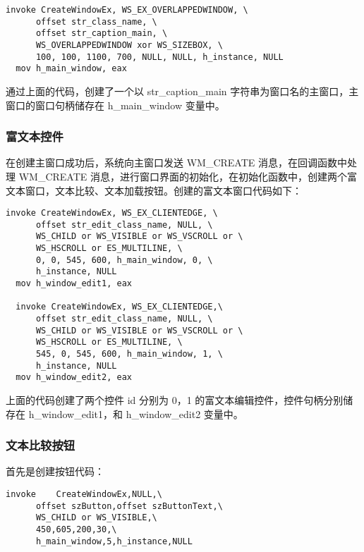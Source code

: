 \documentclass[proposal-report]{bitart}
\begin{document}
\begin{lstlisting}[language={[x86masm]Assembler}]
  invoke CreateWindowEx, WS_EX_OVERLAPPEDWINDOW, \
      offset str_class_name, \
      offset str_caption_main, \
      WS_OVERLAPPEDWINDOW xor WS_SIZEBOX, \
      100, 100, 1100, 700, NULL, NULL, h_instance, NULL
  mov h_main_window, eax
\end{lstlisting}

通过上面的代码，创建了一个以 str\_caption\_main 字符串为窗口名的主窗口，主窗口的窗口句柄储存在 h\_main\_window 变量中。

\subsubsection{富文本控件}

在创建主窗口成功后，系统向主窗口发送 WM\_CREATE 消息，在回调函数中处理 WM\_CREATE 消息，进行窗口界面的初始化，在初始化函数中，创建两个富文本窗口，文本比较、文本加载按钮。创建的富文本窗口代码如下：

\begin{lstlisting}[language={[x86masm]Assembler}]
  invoke CreateWindowEx, WS_EX_CLIENTEDGE, \
      offset str_edit_class_name, NULL, \
      WS_CHILD or WS_VISIBLE or WS_VSCROLL or \
      WS_HSCROLL or ES_MULTILINE, \
      0, 0, 545, 600, h_main_window, 0, \
      h_instance, NULL
  mov h_window_edit1, eax

  invoke CreateWindowEx, WS_EX_CLIENTEDGE,\
      offset str_edit_class_name, NULL, \
      WS_CHILD or WS_VISIBLE or WS_VSCROLL or \
      WS_HSCROLL or ES_MULTILINE, \
      545, 0, 545, 600, h_main_window, 1, \
      h_instance, NULL
  mov h_window_edit2, eax
\end{lstlisting}

上面的代码创建了两个控件 id 分别为 0，1 的富文本编辑控件，控件句柄分别储存在 h\_window\_edit1，和 h\_window\_edit2 变量中。

\subsubsection{文本比较按钮}

首先是创建按钮代码：

\begin{lstlisting}[language={[x86masm]Assembler}]
  invoke	CreateWindowEx,NULL,\
      offset szButton,offset szButtonText,\
      WS_CHILD or WS_VISIBLE,\
      450,605,200,30,\
      h_main_window,5,h_instance,NULL
\end{lstlisting}
\end{document}
